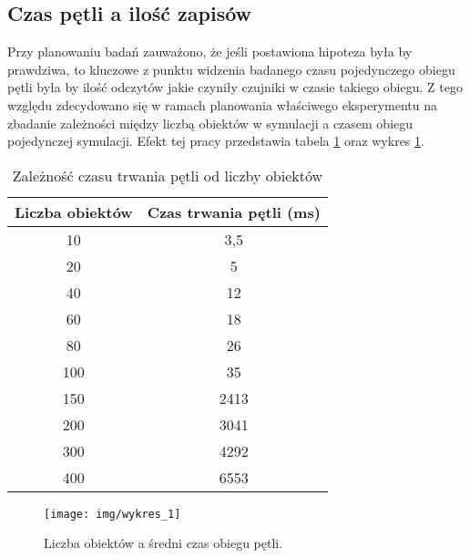 \subsection{Czas pętli a ilość zapisów}
\par{
Przy planowaniu badań zauważono, że jeśli postawiona hipoteza była by prawdziwa, to kluczowe z punktu widzenia badanego czasu pojedynczego obiegu pętli była by ilość odczytów jakie czyniły czujniki w czasie takiego obiegu. Z tego względu zdecydowano się w ramach planowania właściwego eksperymentu na zbadanie zależności między liczbą obiektów w symulacji a czasem obiegu pojedynczej symulacji. Efekt tej pracy przedstawia tabela \ref{ex_1} oraz wykres \ref{ex_1_chart}.
}
\par{
\begin{table}[t]
\caption{Zależność czasu trwania pętli od liczby obiektów}
\label{ex_1}
\begin{center}
\begin{tabular}{|c|c|}
  \hline 
 \textbf{Liczba obiektów} & \textbf{Czas trwania pętli (ms)} \\
  \hline
  10 & 3,5 \\
  20	 & 5 \\
  40	 & 12 \\
  60	 & 18 \\
  80	 & 26 \\
  100 & 35 \\
  150 & 2413 \\
  200 & 3041 \\
  300 & 4292 \\
  400 & 6553 \\
  \hline  
\end{tabular}
\end{center}
\end{table}
}

\begin{figure}[!ht]
    \begin{center}
	\texttt{[image: img/wykres\_1]}
	\caption{Liczba obiektów a średni czas obiegu pętli.}
	\label{ex_1_chart}
    \end{center}
\end{figure}

